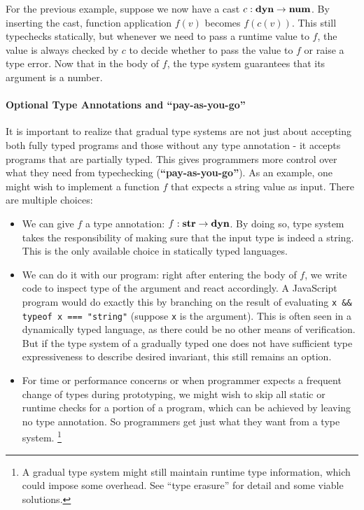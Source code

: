 For the previous example, suppose we now have a cast $c : \textbf{dyn} \rightarrow \textbf{num}$.
By inserting the cast, function application $f(v)$ becomes $f(c(v))$.
This still typechecks statically, but whenever we need to pass a runtime value to $f$,
the value is always checked by $c$ to decide whether to pass the value to $f$ or raise
a type error. Now that in the body of $f$,
the type system guarantees that its argument is a number.

\paragraph{Optional Type Annotations and ``pay-as-you-go''}

It is important to realize that gradual type systems are not just about accepting
both fully typed programs and those without any type annotation - it accepts
programs that are partially typed.
This gives programmers more control over what they need from typechecking (\textbf{``pay-as-you-go''}).
As an example, one might wish to implement a function $f$ that expects a string value
as input. There are multiple choices:

\begin{itemize}
	\item We can give $f$ a type annotation:
	$f : \textbf{str} \rightarrow \textbf{dyn}$. By doing so, type system takes the responsibility
	of making sure that the input type is indeed a string.
	This is the only available choice in statically typed languages.
	\item We can do it with our program: right after entering the body of $f$,
	we write code to inspect type of the argument and react accordingly.
	A JavaScript program would do exactly this by branching
	on the result of evaluating \texttt{x \&\& typeof x === "string"} (suppose \texttt{x} is the argument).
	This is often seen in a dynamically typed language, as there could be no other means
	of verification. But if the type system of a gradually typed one does not have
	sufficient type expressiveness to describe desired invariant, this still remains an option.
	\item For time or performance concerns or when programmer expects a frequent change of types
	during prototyping, we might wish to skip all static or runtime checks for a portion
	of a program, which can be achieved by leaving no type annotation. So programmers
	get just what they want from a type system.
	\footnote{A gradual type system might still maintain runtime type information,
	which could impose some overhead. See ``type erasure'' for detail and some viable solutions.}
\end{itemize}

